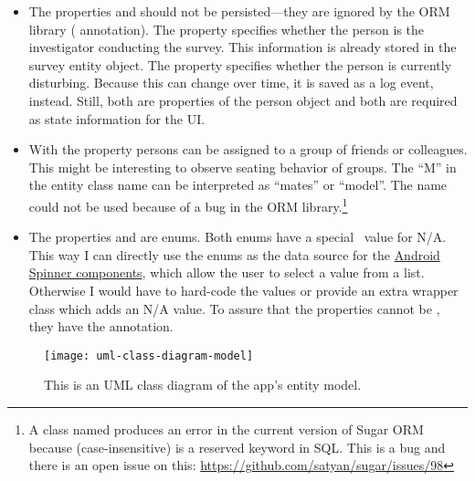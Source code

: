 \begin{itemize}

  \item The properties  and  should not be
    persisted---they are ignored by the \acs{ORM} library (
    annotation).
    The property  specifies whether the person is the investigator
    conducting the survey.
    This information is already stored in the survey entity object.
    The property  specifies whether the person is currently
    disturbing.
    Because this can change over time, it is saved as a log event, instead.
    Still, both are properties of the person object and both are required as
    state information for the \acs{UI}.

  \item With the property  persons can be assigned to a group of
    friends or colleagues. This might be interesting to observe seating behavior
    of groups. The ``M'' in the entity class name  can be
    interpreted as ``mates'' or ``model''. The name  could not be
    used because of a bug in the \acs{ORM} library.\footnote{A class named
       produces an error in the current version of Sugar ORM because
       (case-insensitive) is a reserved keyword in \acs{SQL}.
      This is a bug and there is an open issue on this:
      \url{https://github.com/satyan/sugar/issues/98}}

  \item The properties  and  are enums.
    Both enums have a special \NA\ value for \acf{N/A}.
    This way I can directly use the enums as the data source for the
    \href{https://developer.android.com/guide/topics/ui/controls/spinner.html}{Android
    Spinner components}, which allow the user to select a value from a list.
    Otherwise I would have to hard-code the values or provide an extra
    wrapper class which adds an \acs{N/A} value.
    To assure that the properties cannot be , they have the
     annotation.

\end{itemize}

\begin{figure}[htb]
  \centering
  \texttt{[image: uml-class-diagram-model]}
\caption[\acs{UML} class diagram of the app's entity model.]%
{This is an \acs{UML} class diagram of the app's entity model.}
\label{fig:uml-class-diagram-model}
\end{figure}


